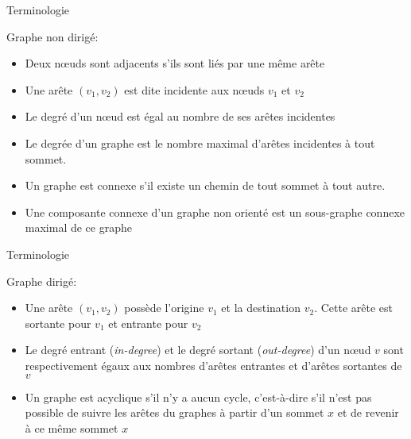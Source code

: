 \begin{frame}{Terminologie}

Graphe non dirigé:
\begin{itemize}
\item Deux n\oe uds sont \alert{adjacents} s'ils sont liés par une même arête
\item Une arête $(v_1,v_2)$ est dite \alert{incidente} aux n\oe uds $v_1$ et $v_2$
\item Le \alert{degré} d'un n\oe ud est égal au nombre de ses arêtes incidentes
\item Le \alert{degrée d'un graphe} est le nombre maximal d'arêtes incidentes à tout sommet.
\item Un graphe est \alert{connexe} s'il existe un chemin de tout sommet à tout autre.
\item Une \alert{composante connexe} d'un graphe non orienté est un sous-graphe connexe
  maximal de ce graphe
\end{itemize}

\end{frame}

\begin{frame}{Terminologie}

Graphe dirigé:
\begin{itemize}
\item Une arête $(v_1,v_2)$ possède l'\alert{origine} $v_1$ et la \alert{destination}
  $v_2$. Cette arête est \alert{sortante} pour $v_1$ et \alert{entrante} pour $v_2$
\item Le degré \alert{entrant} ({\it in-degree}) et le degré \alert{sortant}
  ({\it out-degree}) d'un n\oe ud $v$ sont respectivement égaux aux nombres d'arêtes entrantes et d'arêtes sortantes de $v$
\item Un graphe est \alert{acyclique} s'il n'y a aucun cycle, c'est-à-dire
  s'il n'est pas possible de suivre les arêtes du graphes à partir
  d'un sommet $x$ et de revenir à ce même sommet $x$
\end{itemize}

\end{frame}

